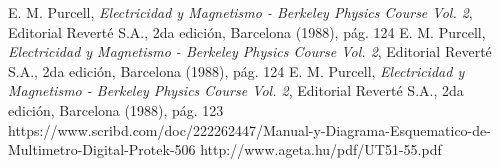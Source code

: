 \documentclass[twoside,twocolumn,a4paper]{article}
\begin{document}
\begin{thebibliography}{99} %

 E. M. Purcell, \textit{Electricidad y Magnetismo - Berkeley Physics Course Vol. 2}, Editorial Revert\'e S.A., 2da edici\'on, Barcelona (1988), p\'ag. 124
 E. M. Purcell, \textit{Electricidad y Magnetismo - Berkeley Physics Course Vol. 2}, Editorial Revert\'e S.A., 2da edici\'on, Barcelona (1988), p\'ag. 124
 E. M. Purcell, \textit{Electricidad y Magnetismo - Berkeley Physics Course Vol. 2}, Editorial Revert\'e S.A., 2da edici\'on, Barcelona (1988), p\'ag. 123
 https://www.scribd.com/doc/222262447/Manual-y-Diagrama-Esquematico-de-Multimetro-Digital-Protek-506
 http://www.ageta.hu/pdf/UT51-55.pdf
 
\end{thebibliography}

\end{document}
